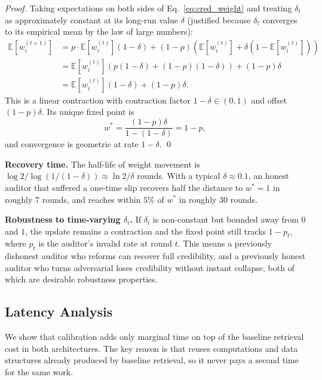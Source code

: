 \begin{proof}
Taking expectations on both sides of Eq.~\ref{eq:cred_weight} and
treating $\delta_t$ as approximately constant at its long-run value
$\delta$ (justified because $\delta_t$ converges to its empirical
mean by the law of large numbers):
\begin{align}
\mathbb{E}[w_i^{(t+1)}]
&= p \cdot \mathbb{E}[w_i^{(t)}](1 - \delta) +
   (1-p) \left( \mathbb{E}[w_i^{(t)}] + \delta(1 - \mathbb{E}[w_i^{(t)}]) \right) \\
&= \mathbb{E}[w_i^{(t)}] \left( p(1-\delta) + (1-p)(1 - \delta) \right) +
   (1-p) \delta \\
&= \mathbb{E}[w_i^{(t)}] (1 - \delta) + (1-p) \delta.
\end{align}
This is a linear contraction with contraction factor $1 - \delta \in
(0, 1)$ and offset $(1-p) \delta$. Its unique fixed point is
\begin{equation}
w^* = \frac{(1-p) \delta}{1 - (1 - \delta)} = 1 - p,
\end{equation}
and convergence is geometric at rate $1 - \delta$. \qed
\end{proof}

\textbf{Recovery time.}
The half-life of weight movement is $\log 2 / \log(1/(1-\delta))
\approx \ln 2 / \delta$ rounds. With a typical $\delta \approx 0.1$,
an honest auditor that suffered a one-time slip recovers half the
distance to $w^* = 1$ in roughly $7$ rounds, and reaches within $5\%$
of $w^*$ in roughly $30$ rounds.

\textbf{Robustness to time-varying $\delta_t$.}
If $\delta_t$ is non-constant but bounded away from $0$ and $1$, the
update remains a contraction and the fixed point still tracks
$1 - p_t$, where $p_t$ is the auditor's invalid rate at round $t$.
This means a previously dishonest auditor who reforms can recover
full credibility, and a previously honest auditor who turns
adversarial loses credibility without instant collapse, both of
which are desirable robustness properties.

\subsection{Latency Analysis}
\label{app:complexity}

We show that calibration adds only marginal time on top of the
baseline retrieval cost in both architectures. The key reason is that
\system reuses computations and data structures already produced by
baseline retrieval, so it never pays a second time for the same work.

